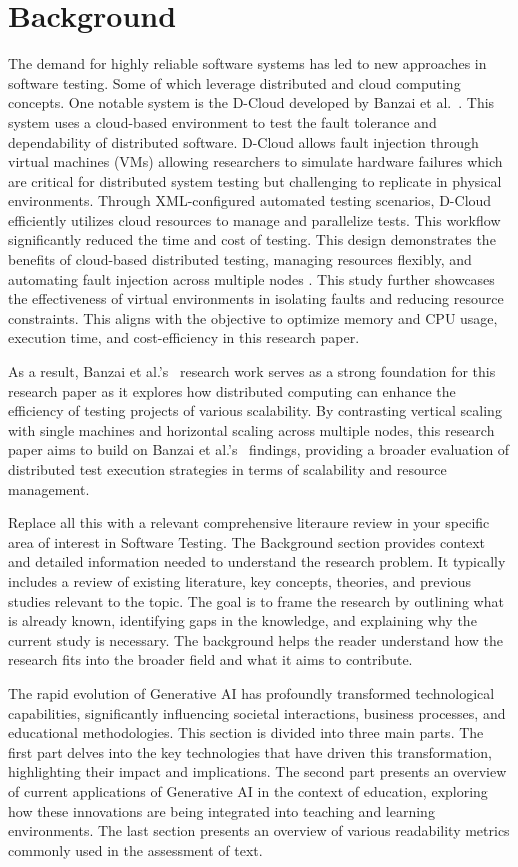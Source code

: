 \section{Background}
\label{Background}

The demand for highly reliable software systems has led to new approaches in software testing. Some of which leverage distributed and cloud computing concepts. One notable system is the D-Cloud developed by Banzai et al.~\cite{banzai2010}. This system uses a cloud-based environment to test the fault tolerance and dependability of distributed software. D-Cloud allows fault injection through virtual machines (VMs) allowing researchers to simulate hardware failures which are critical for distributed system testing but challenging to replicate in physical environments. Through XML-configured automated testing scenarios, D-Cloud efficiently utilizes cloud resources to manage and parallelize tests. This workflow significantly reduced the time and cost of testing. This design demonstrates the benefits of cloud-based distributed testing, managing resources flexibly, and automating fault injection across multiple nodes \cite{banzai2010}. This study further showcases the effectiveness of virtual environments in isolating faults and reducing resource constraints. This aligns with the objective to optimize memory and CPU usage, execution time, and cost-efficiency in this research paper.  

As a result, Banzai et al.’s~\cite{banzai2010} research work serves as a strong foundation for this research paper as it explores how distributed computing can enhance the efficiency of testing projects of various scalability. By contrasting vertical scaling with single machines and horizontal scaling across multiple nodes, this research paper aims to build on Banzai et al.’s~\cite{banzai2010} findings, providing a broader evaluation of distributed test execution strategies in terms of scalability and resource management. 

Replace all this with a relevant comprehensive literaure review in your specific area of interest in Software Testing.  The Background section provides context and detailed information needed to understand the research problem. It typically includes a review of existing literature, key concepts, theories, and previous studies relevant to the topic. The goal is to frame the research by outlining what is already known, identifying gaps in the knowledge, and explaining why the current study is necessary. The background helps the reader understand how the research fits into the broader field and what it aims to contribute. 

The rapid evolution of Generative AI has profoundly transformed technological capabilities, significantly influencing societal interactions, business processes, and educational methodologies. This section is divided into three main parts. The first part delves into the key technologies that have driven this transformation, highlighting their impact and implications. The second part presents an overview of current applications of Generative AI in the context of education, exploring how these innovations are being integrated into teaching and learning environments. The last section presents an overview of various readability metrics commonly used in the assessment of text.
